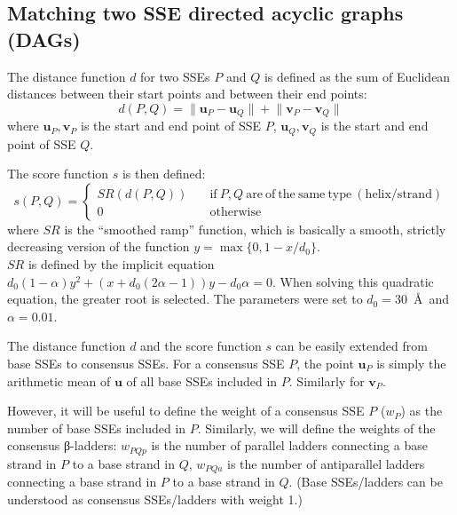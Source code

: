 \documentclass{article}
\begin{document}

\subsection{Matching two SSE directed acyclic graphs (DAGs)}

\label{sec:appendix_matching_dags}

The distance function \(d\) for two SSEs \(P\) and \(Q\) is defined 
as the sum of Euclidean distances between their start points and between their end points:
  \[  d(P, Q) = \lVert \mathbf{u}_P - \mathbf{u}_Q \rVert + \lVert \mathbf{v}_P - \mathbf{v}_Q \rVert  \]
where \(\mathbf{u}_P, \mathbf{v}_P\) is the start and end point of SSE \(P\), 
\(\mathbf{u}_Q, \mathbf{v}_Q\) is the start and end point of SSE \(Q\).

The score function \(s\) is then defined:
  \[
    s(P, Q) = \begin{cases}
                SR(d(P, Q)) \quad & \mathrm{if}\ P, Q\ \mathrm{are\ of\ the\ same\ type\ (helix/strand)} \\
                0           \quad & \mathrm{otherwise}
              \end{cases}
  \]
where \(SR\) is the ``smoothed ramp'' function, which is basically 
a smooth, strictly decreasing version of the function \(y = \max\{0, 1 - x/d_0\} \). \\
\(SR\) is defined by the implicit equation 
\(  d_0 (1 - \alpha) y^2 + (x + d_0 (2\alpha - 1)) y - d_0 \alpha = 0  \).
When solving this quadratic equation, the greater root is selected.
The parameters were set to \(d_0 = 30\)~\AA\ and \(\alpha = 0.01\).

The distance function \(d\) and the score function \(s\) can be easily 
extended from base SSEs to consensus SSEs. 
For a consensus SSE \(P\), the point \(\mathbf{u}_P\) is simply 
the arithmetic mean of \(\mathbf{u}\) of all base SSEs included in \(P\).
Similarly for \(\mathbf{v}_P\).

However, it will be useful to define the weight of a consensus SSE \(P\) (\(w_P\)) 
as the number of base SSEs included in \(P\).
Similarly, we will define the weights of the consensus β-ladders:
\(w_{PQp}\) is the number of parallel ladders connecting 
a base strand in \(P\) to a base strand in \(Q\),
\(w_{PQa}\) is the number of antiparallel ladders connecting 
a base strand in \(P\) to a base strand in \(Q\). 
(Base SSEs/ladders can be understood as consensus SSEs/ladders with weight 1.)
\end{document}

